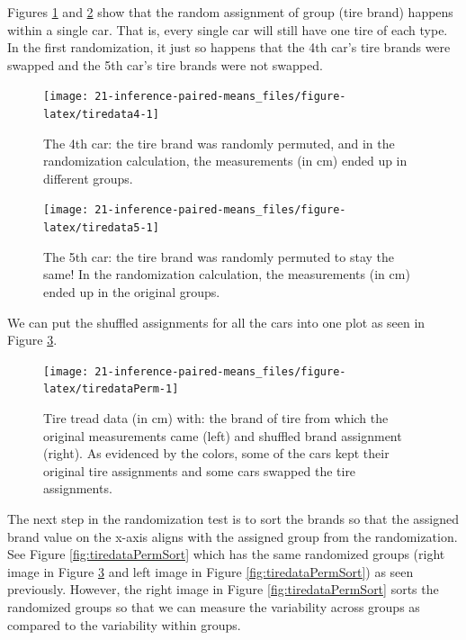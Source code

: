 \documentclass[
  10pt,
  openany]{book}
\begin{document}
Figures \ref{fig:tiredata4} and \ref{fig:tiredata5} show that the random assignment of group (tire brand) happens within a single car.
That is, every single car will still have one tire of each type.
In the first randomization, it just so happens that the 4th car's tire brands were swapped and the 5th car's tire brands were not swapped.

\begin{figure}[h]

{\centering \texttt{[image: 21-inference-paired-means\_files/figure-latex/tiredata4-1]} 

}

\caption{The 4th car: the tire brand was randomly permuted, and in the randomization calculation, the measurements (in cm) ended up in different groups.}\label{fig:tiredata4}
\end{figure}

\begin{figure}[h]

{\centering \texttt{[image: 21-inference-paired-means\_files/figure-latex/tiredata5-1]} 

}

\caption{The 5th car: the tire brand was randomly permuted to stay the same! In the randomization calculation, the measurements (in cm) ended up in the original groups.}\label{fig:tiredata5}
\end{figure}

We can put the shuffled assignments for all the cars into one plot as seen in Figure \ref{fig:tiredataPerm}.

\begin{figure}[h]

{\centering \texttt{[image: 21-inference-paired-means\_files/figure-latex/tiredataPerm-1]} 

}

\caption{Tire tread data (in cm) with: the brand of tire from which the original measurements came (left) and shuffled brand assignment (right).  As evidenced by the colors, some of the cars kept their original tire assignments and some cars swapped the tire assignments.}\label{fig:tiredataPerm}
\end{figure}

The next step in the randomization test is to sort the brands so that the assigned brand value on the x-axis aligns with the assigned group from the randomization.
See Figure \ref{fig:tiredataPermSort} which has the same randomized groups (right image in Figure \ref{fig:tiredataPerm} and left image in Figure \ref{fig:tiredataPermSort}) as seen previously.
However, the right image in Figure \ref{fig:tiredataPermSort} sorts the randomized groups so that we can measure the variability across groups as compared to the variability within groups.
\end{document}
